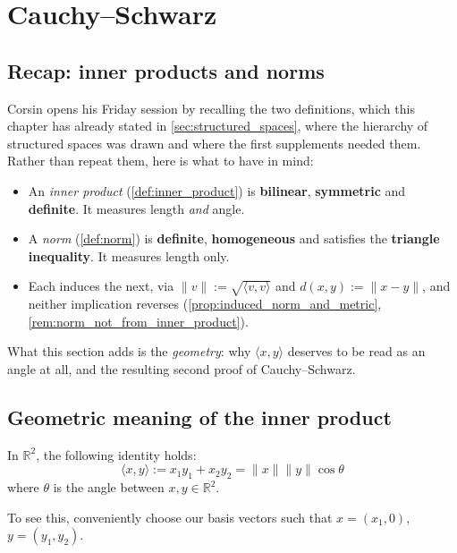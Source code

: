 
\section{Cauchy--Schwarz}
\label{sec:cauchy_schwarz}

\subsection{Recap: inner products and norms}
\label{sec:inner_products_recap}

Corsin opens his Friday session by recalling the two definitions, which this chapter has already
stated in \cref{sec:structured_spaces}, where the hierarchy of structured spaces was drawn and
where the first supplements needed them. Rather than repeat them, here is what to have in mind:
\begin{itemize}
  \item An \emph{inner product} (\cref{def:inner_product}) is \textbf{bilinear},
    \textbf{symmetric} and \textbf{definite}. It measures length \emph{and} angle.
  \item A \emph{norm} (\cref{def:norm}) is \textbf{definite}, \textbf{homogeneous} and
    satisfies the \textbf{triangle inequality}. It measures length only.
  \item Each induces the next, via $\|v\| := \sqrt{\langle v,v\rangle}$ and
    $d(x,y) := \|x-y\|$, and neither implication reverses
    (\cref{prop:induced_norm_and_metric}, \cref{rem:norm_not_from_inner_product}).
\end{itemize}
What this section adds is the \emph{geometry}: why $\langle x,y\rangle$ deserves to be read as an
angle at all, and the resulting second proof of Cauchy--Schwarz.

\subsection{Geometric meaning of the inner product}

In $\mathbb{R}^2$, the following identity holds:
\[
\langle x,y\rangle := x_1y_1 + x_2y_2 = \|x\|\|y\|\cos\theta
\]
where $\theta$ is the angle between $x, y \in \mathbb{R}^2$.

To see this, conveniently choose our basis vectors such that $x = (x_1, 0)$, $y = (y_1, y_2)$.

